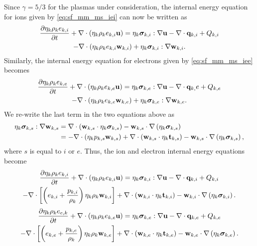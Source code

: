 \documentclass[a4paper,11pt]{report}
\begin{document}
Since $\gamma = 5/3$ for the plasmas under consideration, the internal energy equation for ions given by \cref{eq:sf_mm_ms_iei} can now be written as
\begin{multline*}
    \frac{\partial \eta_k \rho_k e_{k,i}}{\partial t} + \nabla \cdot \left( \eta_k \rho_k e_{k,i} \mathbf{u} \right) = \eta_k \bm \sigma_{k,i} : \nabla \mathbf{u} - \nabla \cdot \mathbf{q}_{k,i} + Q_{k,i} \\
    - \nabla \cdot \left( \eta_k \rho_k e_{k,i} \mathbf{w}_{k,i} \right) + \eta_k \bm \sigma_{k,i} : \nabla \mathbf{w}_{k,i}.
\end{multline*}
Similarly, the internal energy equation for electrons given by \cref{eq:sf_mm_ms_iee} becomes
\begin{multline*}
    \frac{\partial \eta_k \rho_k e_{k,e}}{\partial t} + \nabla \cdot \left( \eta_k \rho_k e_{k,e} \mathbf{u} \right) = \eta_k \bm \sigma_{k,e} : \nabla \mathbf{u} - \nabla \cdot \mathbf{q}_{k,}e + Q_{k,e} \\
    - \nabla \cdot \left( \eta_k \rho_k e_{k,e} \mathbf{w}_{k,e} \right) + \eta_k \bm \sigma_{k,e} : \nabla \mathbf{w}_{k,e}.
\end{multline*}
We re-write the last term in the two equations above as
\begin{align*}
    \eta_k \bm \sigma_{k,s} : \nabla \mathbf{w}_{k,s} &= \nabla \cdot \left( \mathbf{w}_{k,s} \cdot \eta_k \bm \sigma_{k,s} \right) - \mathbf{w}_{k,s} \cdot \nabla \left( \eta_k \bm \sigma_{k,s} \right) \\
    &= -\nabla \cdot (\eta_k p_{k,s} \mathbf{w}_{k,s} ) + \nabla \cdot \left( \mathbf{w}_{k,s} \cdot \eta_k \mathbf{t}_{k,s} \right) - \mathbf{w}_{k,s} \cdot \nabla \left( \eta_k \bm \sigma_{k,s} \right),
\end{align*}
where $s$ is equal to $i$ or $e$. Thus, the ion and electron internal energy equations become
\begin{multline*}
    \frac{\partial \eta_k \rho_k e_{k,i}}{\partial t} + \nabla \cdot \left( \eta_k \rho_k e_{k,i} \mathbf{u} \right) = \eta_k \bm \sigma_{k,i} : \nabla \mathbf{u} - \nabla \cdot \mathbf{q}_{k,i} + Q_{k,i} \\
    - \nabla \cdot \left[ \left( e_{k,i} + \frac{p_{k,i}}{\rho_k} \right) \eta_k \rho_k \mathbf{w}_{k,i} \right] + \nabla \cdot \left( \mathbf{w}_{k,i} \cdot \eta_k \mathbf{t}_{k,i} \right) - \mathbf{w}_{k,i} \cdot \nabla \left( \eta_k \bm \sigma_{k,i} \right).
\end{multline*}
\begin{multline*}
    \frac{\partial \eta_k \rho_k e_{e,k}}{\partial t} + \nabla \cdot \left( \eta_k \rho_k e_{k,e} \mathbf{u} \right) = \eta_k \bm \sigma_{k,e} : \nabla \mathbf{u} - \nabla \cdot \mathbf{q}_{k,e} + Q_{k,e} \\
    - \nabla \cdot \left[ \left( e_{k,e} + \frac{p_{k,e}}{\rho_k} \right) \eta_k \rho_k \mathbf{w}_{k,e} \right] + \nabla \cdot \left( \mathbf{w}_{k,e} \cdot \eta_k \mathbf{t}_{k,e} \right) - \mathbf{w}_{k,e} \cdot \nabla \left( \eta_k \bm \sigma_{k,e} \right).
\end{multline*}
\end{document}
